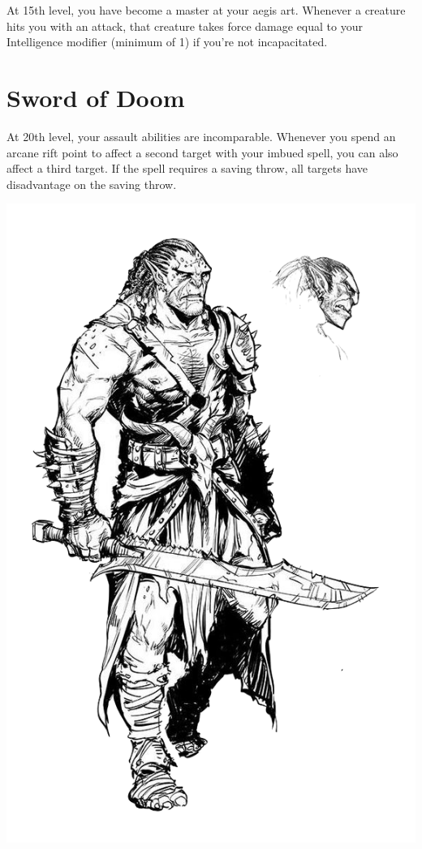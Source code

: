 \begin{multicols*}{2}
At 15th level, you have become a master at your aegis art. Whenever a creature hits you with an attack, that creature takes force damage equal to your Intelligence modifier (minimum of 1) if you’re not incapacitated.

\section*{Sword of Doom}

At 20th level, your assault abilities are incomparable. Whenever you spend an arcane rift point to affect a second target with your imbued spell, you can also affect a third target. If the spell requires a saving throw, all targets have disadvantage on the saving throw.



\begin{Figure}
\centering
\includegraphics[width=\textwidth]{img/orc.png}
\end{Figure}    
    

\end{multicols*}


